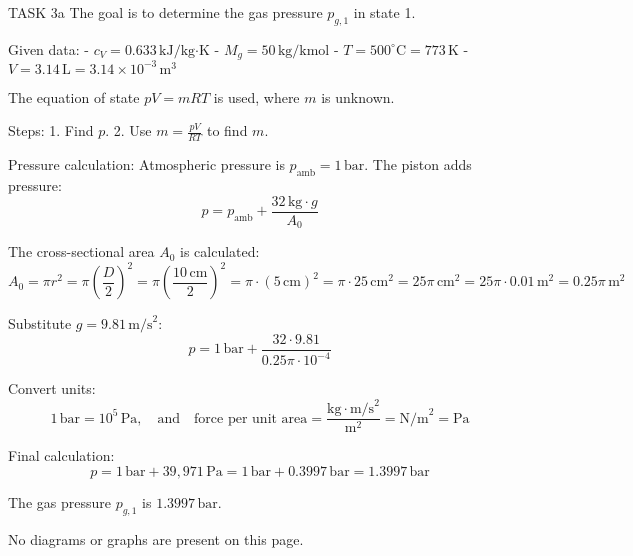 TASK 3a  
The goal is to determine the gas pressure \( p_{g,1} \) in state 1.  

Given data:  
- \( c_V = 0.633 \, \text{kJ/kg·K} \)  
- \( M_g = 50 \, \text{kg/kmol} \)  
- \( T = 500^\circ\text{C} = 773 \, \text{K} \)  
- \( V = 3.14 \, \text{L} = 3.14 \times 10^{-3} \, \text{m}^3 \)  

The equation of state \( pV = mRT \) is used, where \( m \) is unknown.  

Steps:  
1. Find \( p \).  
2. Use \( m = \frac{pV}{RT} \) to find \( m \).  

Pressure calculation:  
Atmospheric pressure is \( p_{\text{amb}} = 1 \, \text{bar} \). The piston adds pressure:  
\[
p = p_{\text{amb}} + \frac{32 \, \text{kg} \cdot g}{A_0}
\]  

The cross-sectional area \( A_0 \) is calculated:  
\[
A_0 = \pi r^2 = \pi \left( \frac{D}{2} \right)^2 = \pi \left( \frac{10 \, \text{cm}}{2} \right)^2 = \pi \cdot (5 \, \text{cm})^2 = \pi \cdot 25 \, \text{cm}^2 = 25 \pi \, \text{cm}^2 = 25 \pi \cdot 0.01 \, \text{m}^2 = 0.25 \pi \, \text{m}^2
\]  

Substitute \( g = 9.81 \, \text{m/s}^2 \):  
\[
p = 1 \, \text{bar} + \frac{32 \cdot 9.81}{0.25 \pi \cdot 10^{-4}}
\]  

Convert units:  
\[
1 \, \text{bar} = 10^5 \, \text{Pa}, \quad \text{and} \quad \text{force per unit area} = \frac{\text{kg} \cdot \text{m/s}^2}{\text{m}^2} = \text{N/m}^2 = \text{Pa}
\]  

Final calculation:  
\[
p = 1 \, \text{bar} + 39,971 \, \text{Pa} = 1 \, \text{bar} + 0.3997 \, \text{bar} = 1.3997 \, \text{bar}
\]  

The gas pressure \( p_{g,1} \) is \( 1.3997 \, \text{bar} \).  

No diagrams or graphs are present on this page.